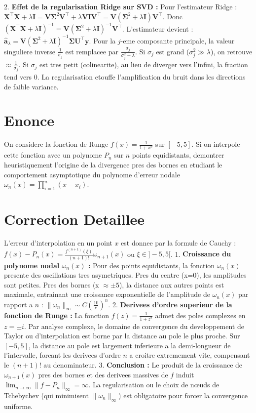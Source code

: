 \documentclass[11pt,a4paper]{report}
\begin{document}
2. \textbf{Effet de la regularisation Ridge sur SVD :}
   Pour l'estimateur Ridge :
   $\mathbf{X}^\top\mathbf{X} + \lambda \mathbf{I} = \mathbf{V} \mathbf{\Sigma}^2 \mathbf{V}^\top + \lambda \mathbf{V} \mathbf{I} \mathbf{V}^\top = \mathbf{V} (\mathbf{\Sigma}^2 + \lambda \mathbf{I}) \mathbf{V}^\top$.
   Donc $(\mathbf{X}^\top\mathbf{X} + \lambda \mathbf{I})^{-1} = \mathbf{V} (\mathbf{\Sigma}^2 + \lambda \mathbf{I})^{-1} \mathbf{V}^\top$.
   L'estimateur devient : $\hat{\mathbf{a}}_\lambda = \mathbf{V} (\mathbf{\Sigma}^2 + \lambda \mathbf{I})^{-1} \mathbf{\Sigma} \mathbf{U}^\top \mathbf{y}$.
   Pour la $j$-eme composante principale, la valeur singuliere inverse $\frac{1}{\sigma_j}$ est remplacee par $\frac{\sigma_j}{\sigma_j^2 + \lambda}$.
   Si $\sigma_j$ est grand ($\sigma_j^2 \gg \lambda$), on retrouve $\approx \frac{1}{\sigma_j}$.
   Si $\sigma_j$ est tres petit (colinearite), au lieu de diverger vers l'infini, la fraction tend vers 0. La regularisation etouffe l'amplification du bruit dans les directions de faible variance.

\section{Enonce}
On considere la fonction de Runge $f(x) = \frac{1}{1+x^2}$ sur $[-5, 5]$.
Si on interpole cette fonction avec un polynome $P_n$ sur $n$ points equidistants, demontrer heuristiquement l'origine de la divergence pres des bornes en etudiant le comportement asymptotique du polynome d'erreur nodale $\omega_n(x) = \prod_{i=1}^n (x - x_i)$.

\section{Correction Detaillee}
L'erreur d'interpolation en un point $x$ est donnee par la formule de Cauchy :
$f(x) - P_n(x) = \frac{f^{(n+1)}(\xi)}{(n+1)!} \omega_{n+1}(x)$ ou $\xi \in ]-5, 5[$.
1. \textbf{Croissance du polynome nodal $\omega_n(x)$ :}
   Pour des points equidistants, la fonction $\omega_n(x)$ presente des oscillations tres asymetriques. Pres du centre (x=0), les amplitudes sont petites. Pres des bornes (x $\approx \pm 5$), la distance aux autres points est maximale, entrainant une croissance exponentielle de l'amplitude de $\omega_n(x)$ par rapport a $n$ : $\|\omega_n\|_\infty \sim C \left(\frac{10}{e}\right)^n$.
2. \textbf{Derivees d'ordre superieur de la fonction de Runge :}
   La fonction $f(z) = \frac{1}{1+z^2}$ admet des poles complexes en $z = \pm i$. Par analyse complexe, le domaine de convergence du developpement de Taylor ou d'interpolation est borne par la distance au pole le plus proche. Sur $[-5, 5]$, la distance au pole est largement inferieure a la demi-longueur de l'intervalle, forcant les derivees d'ordre $n$ a croitre extremement vite, compensant le $(n+1)!$ au denominateur.
3. \textbf{Conclusion :}
   Le produit de la croissance de $\omega_{n+1}(x)$ pres des bornes et des derivees massives de $f$ induit $\lim_{n \to \infty} \|f - P_n\|_\infty = \infty$. La regularisation ou le choix de nœuds de Tchebychev (qui minimisent $\|\omega_n\|_\infty$) est obligatoire pour forcer la convergence uniforme.
\end{document}
